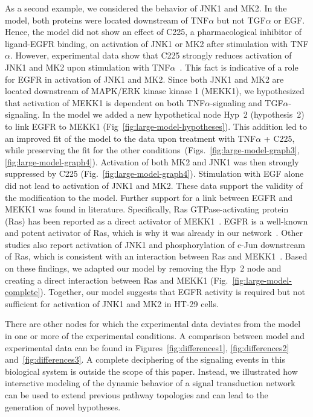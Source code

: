 As a second example, we considered the behavior of JNK1 and MK2. In the model, both
proteins were located downstream of TNF$\alpha$ but not TGF$\alpha$ or EGF. Hence, the
model did not show an effect of C225, a pharmacological inhibitor of ligand-EGFR
binding, on activation of JNK1 or MK2 after stimulation with TNF$\alpha$. However, experimental
data show that C225 strongly reduces activation of JNK1 and MK2 upon stimulation with 
TNF$\alpha$~\citep{pathway-autocrine}.
This fact is indicative of a role for EGFR in activation of JNK1 and MK2. Since both JNK1 and MK2
are located downstream of MAPK/ERK kinase kinase 1 (MEKK1), we hypothesized that activation
of MEKK1 is dependent on
both TNF$\alpha$-signaling and TGF$\alpha$-signaling. In the model we added a new
hypothetical node {\sf Hyp~2} (hypothesis~2) to link EGFR to MEKK1 (Fig~\ref{fig:large-model-hypotheses}).
This addition led to an improved fit of the model to the data upon treatment with TNF$\alpha$ + C225, 
while preserving the fit
for the other conditions~(Figs.~\ref{fig:large-model-graph3}, \ref{fig:large-model-graph4}). 
Activation of both MK2 and JNK1
was then strongly suppressed by C225 (Fig.~\ref{fig:large-model-graph4}).
Stimulation with EGF alone did not lead to activation of JNK1 and MK2.
These data support the validity of the modification to the model.
Further support for a link between EGFR and MEKK1 was found in literature. Specifically,
Ras GTPase-activating protein (Ras) has been reported as a direct activator of
MEKK1~\citep{ras-mekk1}. EGFR is a well-known and potent activator of Ras,
which is why it was already in our network~\citep{kegg}.
Other studies also report activation of JNK1 and phosphorylation of c-Jun downstream of Ras, which is consistent with
an interaction between Ras and MEKK1~\citep{cfos-cjun,ras-jnk1}.
Based on these findings, we adapted
our model by removing the {\sf Hyp~2} node and creating a direct interaction between Ras
and MEKK1 (Fig.~\ref{fig:large-model-complete}). Together, our model suggests that EGFR activity is required 
but not sufficient for activation of JNK1 and MK2 in HT-29 cells.


There are other nodes for which the experimental data deviates from the model in one or more of the experimental conditions.
A comparison between model and experimental data can be found in Figures~\ref{fig:differences1}, \ref{fig:differences2} and~\ref{fig:differences3}.
A complete deciphering of the signaling events
in this biological system is outside the scope of this paper. Instead, we illustrated how interactive modeling of the dynamic behavior
of a signal transduction network can be used to extend previous pathway topologies and can lead to the generation of novel hypotheses.
